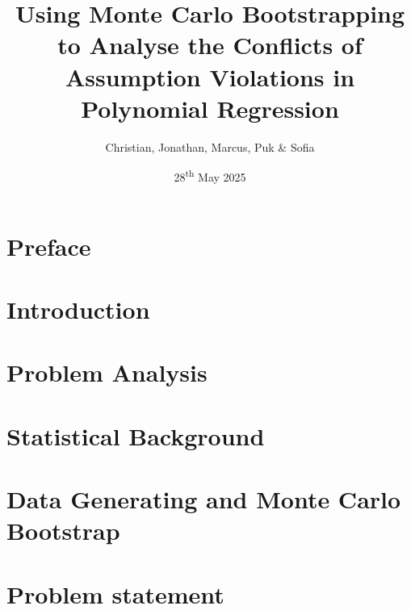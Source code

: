 \documentclass{article}
\title{Using Monte Carlo Bootstrapping to Analyse the Conflicts of Assumption Violations in Polynomial Regression\\}
\author{Christian, Jonathan, Marcus, Puk \& Sofia }
\date{28\textsuperscript{th} May 2025}
\begin{document}
	\setcounter{section}{0}
	
	
	\newpage
	\tableofcontents
	\newpage
	
	\section{Preface}
	
	\newpage
	
	\section{Introduction}
	
	\newpage
	
	\section{Problem Analysis}
	
	\newpage
	\newpage
	\section{Statistical Background}
	
	
	\newpage
 	
	\newpage
	\section{Data Generating and Monte Carlo Bootstrap}
	
	\newpage
	
	\newpage
	
	\newpage
	\section{Problem statement}
	
	\newpage
%	
	
	
%	
	
	
%	
	
\end{document}
